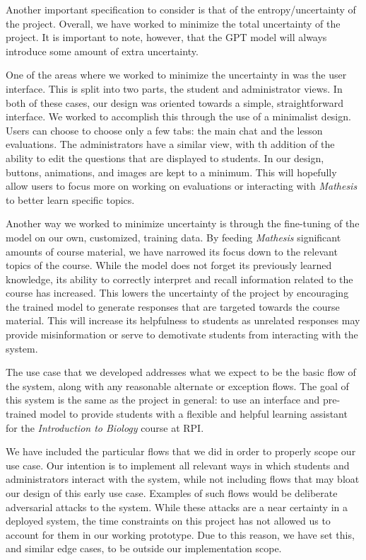\documentclass[12pt,a4paper]{article}
\begin{document}
    Another important specification to consider is that of the entropy/uncertainty of the project.
    Overall, we have worked to minimize the total uncertainty of the project.  It is important to note,
    however, that the GPT model will always introduce some amount of extra uncertainty.

    One of the areas where we worked to minimize the uncertainty in was the user interface.  This is
    split into two parts, the student and administrator views.  In both of these cases, our design
    was oriented towards a simple, straightforward interface.  We worked to accomplish this through
    the use of a minimalist design.  Users can choose to choose only a few tabs: the main chat and
    the lesson evaluations.  The administrators have a similar view, with th addition of the ability
    to edit the questions that are displayed to students.  In our design, buttons, animations, and
    images are kept to a minimum.  This will hopefully allow users to focus more on working on
    evaluations or interacting with \textit{Mathesis} to better learn specific topics.

    Another way we worked to minimize uncertainty is through the fine-tuning of the model on our
    own, customized, training data.  By feeding \textit{Mathesis} significant amounts of course
    material, we have narrowed its focus down to the relevant topics of the course.  While the model
    does not forget its previously learned knowledge, its ability to correctly interpret and recall
    information related to the course has increased.  This lowers the uncertainty of the project
    by encouraging the trained model to generate responses that are targeted towards the course
    material.  This will increase its helpfulness to students as unrelated responses may provide
    misinformation or serve to demotivate students from interacting with the system.

    The use case that we developed addresses what we expect to be the basic flow of the system, along
    with any reasonable alternate or exception flows.  The goal of this system is the same as the
    project in general: to use an interface and pre-trained model to provide students with a flexible
    and helpful learning assistant for the \textit{Introduction to Biology} course at RPI.

    We have included the particular flows that we did in order to properly scope our use case.  Our intention
    is to implement all relevant ways in which students and administrators interact with the system,
    while not including flows that may bloat our design of this early use case.  Examples
    of such flows would be deliberate adversarial attacks to the system.  While these attacks are a
    near certainty in a deployed system, the time constraints on this project has not allowed us to
    account for them in our working prototype. Due to this reason, we have set this, and similar
    edge cases, to be outside our implementation scope.
\end{document}
